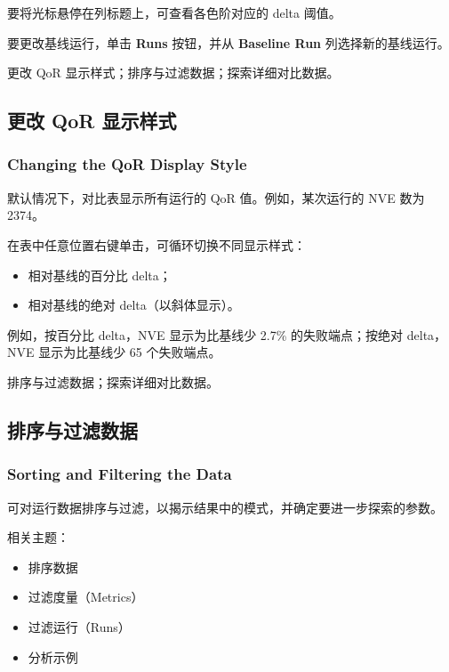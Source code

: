 要将光标悬停在列标题上，可查看各色阶对应的 delta 阈值。

要更改基线运行，单击 \textbf{Runs} 按钮，并从 \textbf{Baseline Run} 列选择新的基线运行。

\begin{seeAlsoBox}
更改 QoR 显示样式；排序与过滤数据；探索详细对比数据。
\end{seeAlsoBox}

\subsection{更改 QoR 显示样式}
\subsubsection*{Changing the QoR Display Style}

默认情况下，对比表显示所有运行的 QoR 值。例如，某次运行的 NVE 数为 2374。

在表中任意位置右键单击，可循环切换不同显示样式：
\begin{itemize}
  \item 相对基线的百分比 delta；
  \item 相对基线的绝对 delta（以斜体显示）。
\end{itemize}

例如，按百分比 delta，NVE 显示为比基线少 2.7\% 的失败端点；按绝对 delta，NVE 显示为比基线少 65 个失败端点。

\begin{seeAlsoBox}
排序与过滤数据；探索详细对比数据。
\end{seeAlsoBox}

\subsection{排序与过滤数据}
\subsubsection*{Sorting and Filtering the Data}

可对运行数据排序与过滤，以揭示结果中的模式，并确定要进一步探索的参数。

相关主题：
\begin{itemize}
  \item 排序数据
  \item 过滤度量（Metrics）
  \item 过滤运行（Runs）
  \item 分析示例
\end{itemize}

